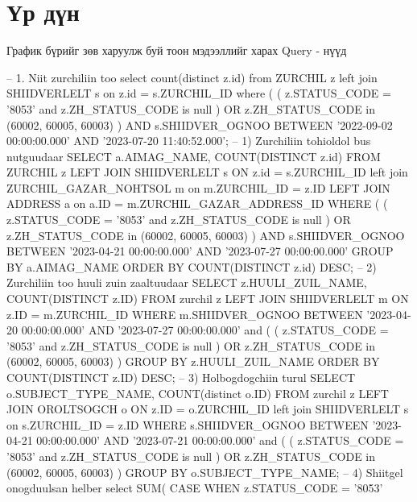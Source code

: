 \section{Үр дүн} График бүрийг зөв харуулж буй тоон мэдээллийг харах Query - нүүд 
\begin{mycode}[caption =, language = SQL] 
    -- 1. Niit zurchiliin too
    select 
      count(distinct z.id) 
    from 
      ZURCHIL z 
      left join SHIIDVERLELT s on z.id = s.ZURCHIL_ID 
    where 
      (
        (
          z.STATUS_CODE = '8053' 
          and z.ZH_STATUS_CODE is null
        ) 
        OR z.ZH_STATUS_CODE in (60002, 60005, 60003)
      ) 
      AND s.SHIIDVER_OGNOO BETWEEN '2022-09-02 00:00:00.000' 
      AND '2023-07-20 11:40:52.000';
    -- 1) Zurchiliin tohioldol bus nutguudaar
    SELECT 
      a.AIMAG_NAME, 
      COUNT(DISTINCT z.id) 
    FROM 
      ZURCHIL z 
      LEFT JOIN SHIIDVERLELT s ON z.id = s.ZURCHIL_ID 
      left join ZURCHIL_GAZAR_NOHTSOL m on m.ZURCHIL_ID = z.ID 
      LEFT JOIN ADDRESS a on a.ID = m.ZURCHIL_GAZAR_ADDRESS_ID 
    WHERE 
      (
        (
          z.STATUS_CODE = '8053' 
          and z.ZH_STATUS_CODE is null
        ) 
        OR z.ZH_STATUS_CODE in (60002, 60005, 60003)
      ) 
      AND s.SHIIDVER_OGNOO BETWEEN '2023-04-21 00:00:00.000' 
      AND '2023-07-27 00:00:00.000' 
    GROUP BY 
      a.AIMAG_NAME 
    ORDER BY 
      COUNT(DISTINCT z.id) DESC;
    -- 2) Zurchiliin too huuli zuin zaaltuudaar
    SELECT 
      z.HUULI_ZUIL_NAME, 
      COUNT(DISTINCT z.ID) 
    FROM 
      zurchil z 
      LEFT JOIN SHIIDVERLELT m ON z.ID = m.ZURCHIL_ID 
    WHERE 
      m.SHIIDVER_OGNOO BETWEEN '2023-04-20 00:00:00.000' 
      AND '2023-07-27 00:00:00.000' 
      and (
        (
          z.STATUS_CODE = '8053' 
          and z.ZH_STATUS_CODE is null
        ) 
        OR z.ZH_STATUS_CODE in (60002, 60005, 60003)
      ) 
    GROUP BY 
      z.HUULI_ZUIL_NAME 
    ORDER BY 
      COUNT(DISTINCT z.ID) DESC;
    -- 3) Holbogdogchiin turul
    SELECT 
      o.SUBJECT_TYPE_NAME, 
      COUNT(distinct o.ID) 
    FROM 
      zurchil z 
      LEFT JOIN OROLTSOGCH o ON z.ID = o.ZURCHIL_ID 
      left join SHIIDVERLELT s on s.ZURCHIL_ID = z.ID 
    WHERE 
      s.SHIIDVER_OGNOO BETWEEN '2023-04-21 00:00:00.000' 
      AND '2023-07-21 00:00:00.000' 
      and (
        (
          z.STATUS_CODE = '8053' 
          and z.ZH_STATUS_CODE is null
        ) 
        OR z.ZH_STATUS_CODE in (60002, 60005, 60003)
      ) 
    GROUP BY 
      o.SUBJECT_TYPE_NAME;
    -- 4) Shiitgel onogduulsan helber
    select 
      SUM(
        CASE WHEN z.STATUS_CODE = '8053' 

\end{mycode}
